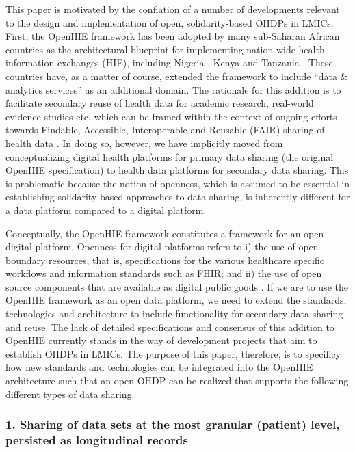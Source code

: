 \documentclass[
  authoryear]{elsarticle}
\begin{document}
This paper is motivated by the conflation of a number of developments
relevant to the design and implementation of open, solidarity-based
OHDPs in LMICs. First, the OpenHIE framework \citep{openhie} has been
adopted by many sub-Saharan African countries \citep{mamuye2022health}
as the architectural blueprint for implementing nation-wide health
information exchanges (HIE), including Nigeria \citep{dalhatu2023paper},
Kenya \citep{thaiya2021adoption} and Tanzania \citep{nsaghurwe2021one}.
These countries have, as a matter of course, extended the framework to
include ``data \& analytics services'' as an additional domain. The
rationale for this addition is to facilitate secondary reuse of health
data for academic research, real-world evidence studies etc. which can
be framed within the context of ongoing efforts towards Findable,
Accessible, Interoperable and Reusable (FAIR) sharing of health data
\citep{guillot2023fair}. In doing so, however, we have implicitly moved
from conceptualizing digital health platforms for primary data sharing
(the original OpenHIE specification) to health data platforms for
secondary data sharing. This is problematic because the notion of
openness, which is assumed to be essential in establishing
solidarity-based approaches to data sharing, is inherently different for
a data platform compared to a digital platform.

Conceptually, the OpenHIE framework constitutes a framework for an open
digital platform. Openness for digital platforms refers to i) the use of
open boundary resources, that is, specifications for the various
healthcare specific workflows and information standards such as FHIR;
and ii) the use of open source components that are available as digital
public goods \citep{digitalpublicgoods}. If we are to use the OpenHIE
framework as an open data platform, we need to extend the standards,
technologies and architecture to include functionality for secondary
data sharing and reuse. The lack of detailed specifications and
consensus of this addition to OpenHIE currently stands in the way of
development projects that aim to establish OHDPs in LMICs. The purpose
of this paper, therefore, is to specificy how new standards and
technologies can be integrated into the OpenHIE architecture such that
an open OHDP can be realized that supports the following different types
of data sharing.

\subsubsection{1. Sharing of data sets at the most granular (patient)
level, persisted as longitudinal
records}\label{sharing-of-data-sets-at-the-most-granular-patient-level-persisted-as-longitudinal-records}
\end{document}
